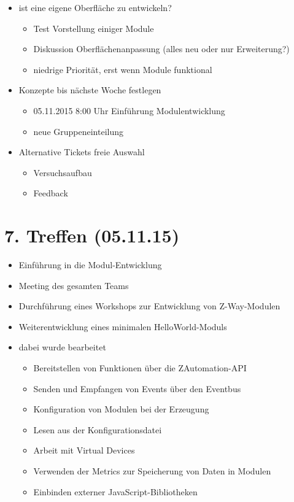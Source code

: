 \begin{itemize}
	\item ist eine eigene Oberfläche zu entwickeln?
	\begin{itemize}
		\item Test Vorstellung einiger Module
		\item Diskussion Oberflächenanpassung (alles neu oder nur Erweiterung?)
		\item niedrige Priorität, erst wenn Module funktional
	\end{itemize}
	
	\item Konzepte bis nächste Woche festlegen

	\begin{itemize}
		\item 05.11.2015 8:00 Uhr Einführung Modulentwicklung
		\item neue Gruppeneinteilung
	\end{itemize}

	\item Alternative Tickets freie Auswahl
	\begin{itemize}
		\item Versuchsaufbau
		\item Feedback
	\end{itemize}
	
\end{itemize}

\section{7. Treffen (05.11.15)}
\begin{itemize}
	\item Einführung in die Modul-Entwicklung
	\item Meeting des gesamten Teams
	\item Durchführung eines Workshops zur Entwicklung von Z-Way-Modulen
	\item Weiterentwicklung eines minimalen HelloWorld-Moduls
	\item dabei wurde bearbeitet
	\begin{itemize}
		\item Bereitstellen von Funktionen über die ZAutomation-API
		\item Senden und Empfangen von Events über den Eventbus
		\item Konfiguration von Modulen bei der Erzeugung
		\item Lesen aus der Konfigurationsdatei
		\item Arbeit mit Virtual Devices
		\item Verwenden der Metrics zur Speicherung von Daten in Modulen
		\item Einbinden externer JavaScript-Bibliotheken
	\end{itemize}
\end{itemize}

